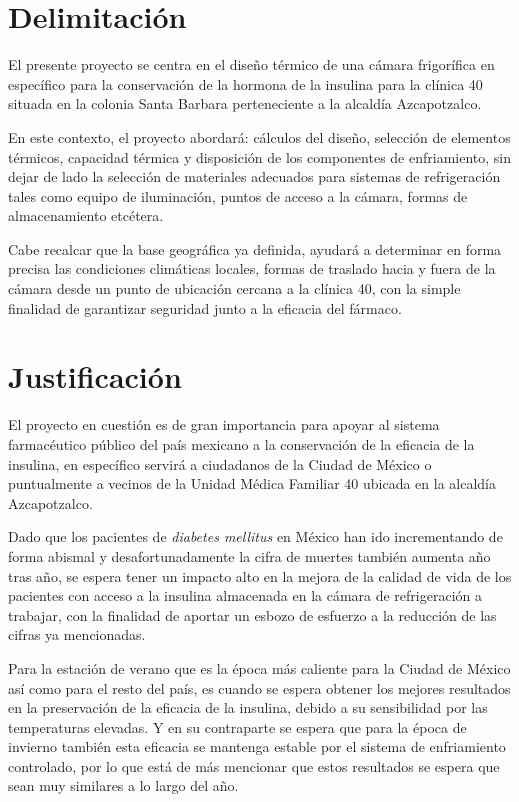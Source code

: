 \newpage
\section*{Delimitación}
 
El presente proyecto se centra en el diseño térmico de una cámara frigorífica en específico para la conservación de la hormona de la insulina para la clínica 40 situada en la colonia Santa Barbara perteneciente a la alcaldía Azcapotzalco.

En este contexto, el proyecto abordará: cálculos del diseño, selección de elementos térmicos, capacidad térmica y disposición de los componentes de enfriamiento, sin dejar de lado la selección de materiales adecuados para sistemas de refrigeración tales como equipo de iluminación, puntos de acceso a la cámara, formas de almacenamiento etcétera. 

Cabe recalcar que la base geográfica ya definida, ayudará a determinar en forma precisa las condiciones climáticas locales, formas de traslado hacia y fuera de la cámara desde un punto de ubicación cercana a la clínica 40, con la simple finalidad de garantizar seguridad junto a la eficacia del fármaco. 





\newpage
\section*{Justificación}


El proyecto en cuestión es de gran importancia para apoyar al sistema farmacéutico público del país mexicano a la conservación de la eficacia de la insulina, en específico  servirá a ciudadanos de la Ciudad de México o puntualmente a vecinos de la Unidad Médica Familiar 40 ubicada en la alcaldía Azcapotzalco.

Dado que los pacientes de \textit{diabetes mellitus} en México han ido incrementando de forma abismal y desafortunadamente la cifra de muertes también aumenta año tras año, se espera tener un impacto alto en la mejora de la calidad de vida de los pacientes con acceso a la insulina almacenada en la cámara de refrigeración a trabajar, con la finalidad de aportar un esbozo de esfuerzo a la reducción de las cifras ya mencionadas.

Para la estación de verano que es la época más caliente para la Ciudad de 
México así como para el resto del país, es cuando se espera obtener los mejores resultados en la preservación de la eficacia de la insulina, debido a su sensibilidad por las temperaturas elevadas. Y en su contraparte se espera que para la época de invierno también esta eficacia se mantenga estable por el sistema de enfriamiento controlado, por lo que está de más mencionar que estos resultados se espera que sean muy similares a lo largo del año. 



